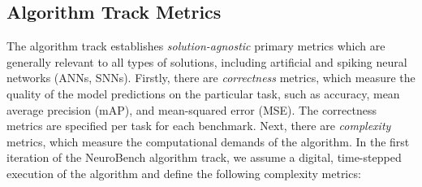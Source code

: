     \subsection*{Algorithm Track Metrics}
    The algorithm track establishes \textit{solution-agnostic} primary metrics which are generally relevant to all types of solutions, including artificial and spiking neural networks (ANNs, SNNs). Firstly, there are \textit{correctness} metrics, which measure the quality of the model predictions on the particular task, such as accuracy, mean average precision (mAP), and mean-squared error (MSE). The correctness metrics are specified per task for each benchmark. Next, there are \textit{complexity} metrics, which measure the computational demands of the algorithm. In the first iteration of the NeuroBench algorithm track, we assume a digital, time-stepped execution of the algorithm and define the following complexity metrics:

